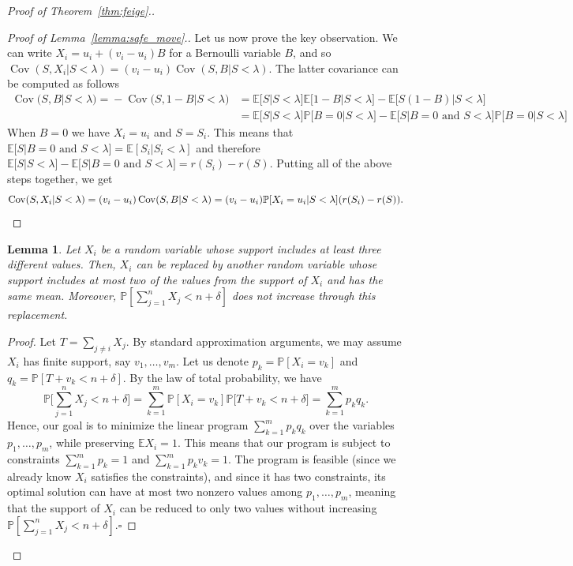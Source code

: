 \documentclass[10pt,a4paper]{article}
\newtheorem{lemma}{Lemma}
\newcommand{\bE}{\mathbb{E}}
\newcommand{\Pb}{\mathbb P}
\newcommand{\Cov}{\operatorname{Cov}}
\begin{document}
\begin{proof}[Proof of Theorem~\ref{thm:feige}.]
\begin{proof}[Proof of Lemma~\ref{lemma:safe_move}.]
Let us now prove the key observation. We can write $X_i=u_i+(v_i-u_i)B$ for a Bernoulli variable $B$, and so $\Cov(S, X_i|S<\lambda)=(v_i-u_i)\Cov(S, B|S<\lambda)$. The latter covariance can be computed as follows
\vspace{-0.1cm}
\begin{align*}
\Cov\!\big(S, B\big|S<\lambda\big)\!=\!-\!\Cov\!\big(S, 1\!-\!B\big| S\!<\!\lambda\big)\!&=\!\bE\big[S\big|S\!<\!\lambda\big]\bE\big[1\!-\!B\big|S\!<\!\lambda\big]\!-\!\bE\big[S(1-B)\big|S<\lambda\big]\\
&=\!\bE\big[S\big|S\!<\!\lambda\big]\Pb\big[B\!=\!0\big|S\!<\!\lambda\big]\!-\!\bE\big[S\big|B\!=\!0\text{ and }S\!<\!\lambda\big]\Pb\big[B\!=\!0\big|S\!<\!\lambda\big]
\end{align*}
When $B=0$ we have $X_i=u_i$ and $S=S_i$. This means that 
$\bE\big[S\big|B\!=\!0\text{ and }S\!<\!\lambda\big]=\bE[S_i|S_i<\lambda]$ and therefore
$\bE\big[S\big|S\!<\!\lambda\big]\!-\!\bE\big[S\big|B\!=\!0\text{ and }S\!<\!\lambda\big]=r(S_i)-r(S)$.
Putting all of the above steps together, we get \[\Cov(S, X_i|S<\lambda)=(v_i-u_i)\Cov(S, B|S<\lambda)= (v_i-u_i)\Pb[X_i=u_i|S<\lambda](r(S_i)-r(S)).\qedhere\]
\end{proof}
\begin{lemma}\label{lemma:two_values}
Let $X_i$ be a random variable whose support includes at least three different values. Then, $X_i$ can be replaced by another random variable whose support includes at most two of the values from the support of $X_i$ and has the same mean. Moreover, $\Pb[\sum_{j=1}^n X_j<n+\delta]$ does not increase through this replacement.
\end{lemma}
\begin{proof}
Let $T=\sum_{j\ne i}X_j$. By standard approximation arguments, we may assume $X_i$ has finite support, say $v_1, \dots, v_m$. Let us denote $p_k=\Pb[X_i=v_k]$ and $q_k=\Pb[T+v_k<n+\delta]$. By the law of total probability, we have 
\[\Pb\Big[\sum_{j=1}^n X_j<n+\delta\Big]=\sum_{k=1}^m \Pb[X_i=v_k]\Pb\big[T+v_k<n+\delta\big]=\sum_{k=1}^m p_kq_k.\]
Hence, our goal is to minimize the linear program $\sum_{k=1}^m p_kq_k$ over the variables $p_1, \dots, p_m$, while preserving $\bE X_i=1$. This means that our program is subject to constraints $\sum_{k=1}^m p_k=1$ and $\sum_{k=1}^m p_kv_k=1$. The program is feasible (since we already know $X_i$ satisfies the constraints), and since it has two constraints, its optimal solution can have at most two nonzero values among $p_1, \dots, p_m$, meaning that the support of $X_i$ can be reduced to only two values without increasing $\Pb[\sum_{j=1}^n X_j<n+\delta]$.\hspace{5cm}$\square$
\end{proof}
\renewcommand{\qedsymbol}{}
\end{proof}
\end{document}
